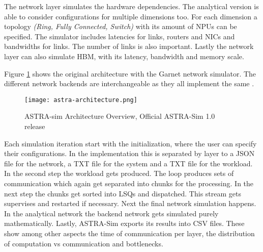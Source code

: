The network layer simulates the hardware dependencies. The analytical version is able to consider configurations for multiple dimensions too. For each dimension a topology \textit{(Ring, Fully Connected, Switch)} with its amount of \acp{NPU} can be specified. The simulator includes latencies for links, routers and \acp{NIC} and bandwidths for links. The number of links is also important. Lastly the network layer can also simulate \ac{HBM}, with its latency, bandwidth and memory scale. 

Figure \ref{fig:astra-architecture} shows the original architecture with the Garnet network simulator. The different network backends are interchangeable as they all implement the same .

\begin{figure}[H]
    \centering
    \texttt{[image: astra-architecture.png]}
    \caption{ASTRA-sim Architecture Overview, Official ASTRA-Sim 1.0 release~\cite{rashidi_astra-sim_2020}}
  \label{fig:astra-architecture}
\end{figure}

Each simulation iteration start with the initialization, where the user can specify their configurations. In the implementation this is separated by layer to a \ac{JSON} file for the network, a \ac{TXT} file for the system and a \ac{TXT} file for the workload. 
In the second step the workload gets produced. The loop produces sets of communication which again get separated into chunks for the processing.
In the next step the chunks get sorted into \acp{LSQ} and dispatched. This stream gets supervises and restarted if necessary. 
Next the final network simulation happens. In the analytical network the backend network gets simulated purely mathematically.
Lastly, \ac{ASTRA-Sim} exports its results into \ac{CSV} files. These show among other aspects the time of communication per layer, the distribution of computation vs communication and bottlenecks.


